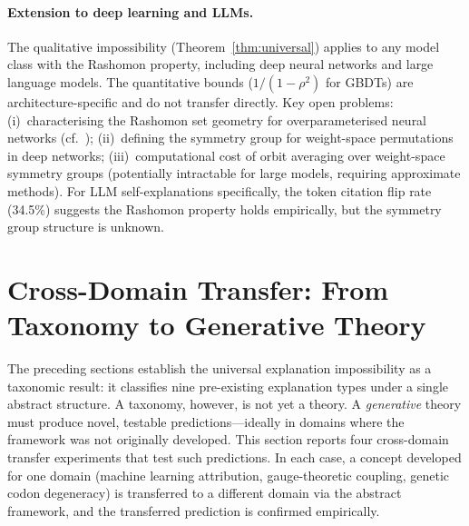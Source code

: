 \documentclass[11pt,a4paper]{article}
\begin{document}
\paragraph{Extension to deep learning and LLMs.}
The qualitative impossibility (Theorem~\ref{thm:universal}) applies to any model class with the Rashomon property, including deep neural networks and large language models. The quantitative bounds ($1/(1{-}\rho^2)$ for GBDTs) are architecture-specific and do not transfer directly. Key open problems: (i)~characterising the Rashomon set geometry for overparameterised neural networks (cf.~\citet{damour2022underspecification}); (ii)~defining the symmetry group for weight-space permutations in deep networks; (iii)~computational cost of orbit averaging over weight-space symmetry groups (potentially intractable for large models, requiring approximate methods). For LLM self-explanations specifically, the token citation flip rate (34.5\%) suggests the Rashomon property holds empirically, but the symmetry group structure is unknown.

\section{Cross-Domain Transfer: From Taxonomy to Generative Theory}
\label{sec:cross-domain}

The preceding sections establish the universal explanation impossibility as a
taxonomic result: it classifies nine pre-existing explanation types under a
single abstract structure.  A taxonomy, however, is not yet a theory.  A
\emph{generative} theory must produce novel, testable predictions---ideally in
domains where the framework was not originally developed.  This section reports
four cross-domain transfer experiments that test such predictions.  In each
case, a concept developed for one domain (machine learning attribution,
gauge-theoretic coupling, genetic codon degeneracy) is transferred to a
different domain via the abstract framework, and the transferred prediction is
confirmed empirically.
\end{document}
